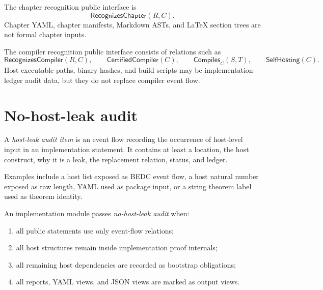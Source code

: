 \begin{definition}
\label{def:implementation-interface-chapter-public}
The chapter recognition public interface is
$$
  \mathsf{RecognizesChapter}(R,C).
$$
Chapter YAML, chapter manifests, Markdown ASTs, and LaTeX section trees are not formal chapter inputs.
\end{definition}

\begin{definition}
\label{def:implementation-interface-compiler-public}
The compiler recognition public interface consists of relations such as
$$
  \mathsf{RecognizesCompiler}(R,C),
  \qquad
  \mathsf{CertifiedCompiler}(C),
  \qquad
  \mathsf{Compiles}_{C}(S,T),
  \qquad
  \mathsf{SelfHosting}(C).
$$
Host executable paths, binary hashes, and build scripts may be implementation-ledger audit data, but they do not replace compiler event flow.
\end{definition}

\section{No-host-leak audit}
\label{sec:implementation-interface-no-host-leak-audit}

\begin{definition}
\label{def:implementation-interface-host-leak-audit-item}
A \emph{host-leak audit item} is an event flow recording the occurrence of host-level input in an implementation statement. It contains at least a location, the host construct, why it is a leak, the replacement relation, status, and ledger.

Examples include a host list exposed as BEDC event flow, a host natural number exposed as raw length, YAML used as package input, or a string theorem label used as theorem identity.
\end{definition}

\begin{definition}
\label{def:implementation-interface-no-host-leak-audit}
An implementation module passes \emph{no-host-leak audit} when:
\begin{enumerate}
\item all public statements use only event-flow relations;
\item all host structures remain inside implementation proof internals;
\item all remaining host dependencies are recorded as bootstrap obligations;
\item all reports, YAML views, and JSON views are marked as output views.
\end{enumerate}
\end{definition}

